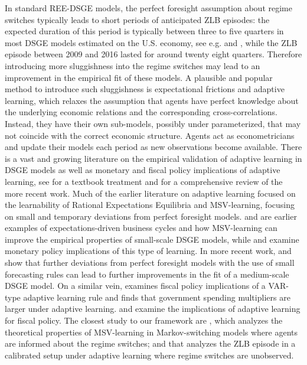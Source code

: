 \documentclass[12pt,reqno]{article}
\numberwithin{equation}{section}
\begin{document}
\noindent
In standard REE-DSGE models, the perfect foresight assumption about regime switches typically leads to short periods of anticipated ZLB episodes: the expected duration of this period is typically between three to five quarters in most DSGE models estimated on the U.S. economy, see e.g. \cite{linde2017estimation} and \cite{ji2016government}, while the ZLB episode between 2009 and 2016 lasted for around twenty eight quarters. Therefore introducing more sluggishness into the regime switches may lead to an improvement in the empirical fit of these models. A plausible and popular method to introduce such sluggishness is expectational frictions and adaptive learning, which relaxes the assumption that agents have perfect knowledge about the underlying economic relations and  the corresponding cross-correlations. Instead, they have their own sub-models, possibly under parameterized, that may not coincide with the correct economic structure. Agents act as econometricians and update their models each period as new observations become available. There is a vast and growing literature on the empirical validation of adaptive learning in DSGE models as well as monetary and fiscal policy implications of adaptive learning, see \cite{evans2012learning} for a textbook treatment and \cite{woodford2013macroeconomic} for a comprehensive review of the more recent work. Much of the earlier literature on adaptive learning focused on the learnability of Rational Expectations Equilibria and MSV-learning, focusing on small and  temporary deviations from perfect foresight models.  \cite{milani2007expectations} and \cite{eusepi2011expectations} are earlier examples of expectations-driven business cycles and how MSV-learning can improve the empirical properties of small-scale DSGE models, while \cite{bullard2002learning} and \cite{bullard2014does} examine monetary policy implications of this type of learning. In more recent work,   \cite{slobodyan2012blearning} and \cite{slobodyan2012alearning} show that further deviations from perfect foresight models with the use of small forecasting rules can lead to further improvements in the fit of a medium-scale DSGE model. On a similar vein, \cite{quaghebeur2018learning} examines fiscal policy implications of a VAR-type adaptive learning rule and finds that government spending multipliers are larger under adaptive learning. \cite{evans2008liquidity} and  \cite{evans201011} examine the implications of adaptive learning for fiscal policy. The closest study to our framework are \cite{branch2013adaptive}, which analyzes the theoretical properties of MSV-learning in Markov-switching models where agents are informed about the regime switches; and \cite{lansing2018endogenous} that analyzes the ZLB episode in a calibrated setup under adaptive learning where regime switches are unobserved. 
\end{document}
